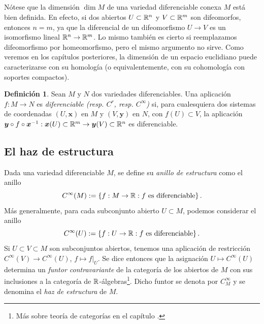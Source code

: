 \documentclass[11pt,a4paper]{amsbook}
\theoremstyle{remark} \newtheorem{rmk}[subsection]{Observación}
\theoremstyle{definition} \newtheorem{defn}[subsection]{Definición}
\theoremstyle{definition} \newtheorem{ex}[subsection]{Ejemplo}
\theoremstyle{definition} \newtheorem{ej}[subsection]{Ejercicio}
\begin{document}
\subsection{}
Nótese que la dimensión $\dim M$ de una variedad diferenciable conexa $M$ está bien definida. En efecto, si dos abiertos $U\subset \mathbb R^n$ y $V\subset \mathbb R^m$ son difeomorfos, entonces $n=m$, ya que la diferencial de un difeomorfismo $U\rightarrow V$ es un isomorfismo lineal $\mathbb R^n\rightarrow \mathbb R^m$. Lo mismo también es cierto si reemplazamos difeomorfismo por homeomorfismo, pero el mismo argumento no sirve. Como veremos en los capítulos posteriores, la dimensión de un espacio euclidiano puede caracterizarse con su homología (o equivalentemente, con su cohomología con soportes compactos).

\begin{defn}
Sean $M$ y $N$ dos variedades diferenciables. Una aplicación $f:M\rightarrow N$ es \emph{diferenciable (resp. $C^r$, resp. $C^\infty$)} si, para cualesquiera dos sistemas de coordenadas $(U,\bm{x})$ en $M$ y $(V,\bm{y})$ en $N$, con $f(U)\subset V$, la aplicación $\bm{y} \circ f \circ \bm{x}^{-1}: \bm{x}(U)\subset \mathbb R^m \rightarrow \bm{y}(V)\subset \mathbb R^n$ es diferenciable.
\end{defn}

\subsection{El haz de estructura}
  Dada una variedad diferenciable $M$, se define su \emph{anillo de estructura} como el anillo
  \begin{equation*}
C^\infty(M):= \left\{ f:M\rightarrow \mathbb R : f\text{ es diferenciable} \right\}.
  \end{equation*}
  Más generalmente, para cada subconjunto abierto $U\subset M$, podemos considerar el anillo
  \begin{equation*}
C^\infty(U):= \left\{ f:U\rightarrow \mathbb R : f\text{ es diferenciable} \right\}.
  \end{equation*}
  Si $U\subset V\subset M$ son subconjuntos abiertos, tenemos una aplicación de restricción $C^\infty(V)\rightarrow C^\infty(U)$, $f\mapsto f|_U$. Se dice entonces que la asignación $U\mapsto C^\infty(U)$ determina un \emph{funtor contravariante} de la categoría de los abiertos de $M$ con sus inclusiones a la categoría de $\mathbb R$-álgebras\footnote{Más sobre teoría de categorías en el capítulo .}. Dicho funtor se denota por $C^\infty_M$ y se denomina el \emph{haz de estructura} de $M$.
\end{document}
